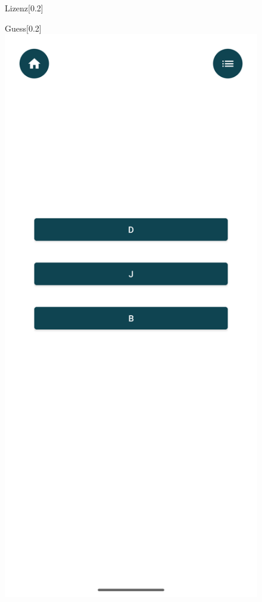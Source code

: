 \documentclass[12pt,a4paper]{article}
\begin{document}
\begin{figure}[h]
\begin{subcaptionbox}{Lizenz\label{fig:bild1}}[0.2\linewidth]
    \end{subcaptionbox}
    \hfill
    \begin{subcaptionbox}{Guess\label{fig:bild2}}[0.2\linewidth]
        {\includegraphics[width=\linewidth]{showcase/light_guess.png}}
    \end{subcaptionbox}
    \label{fig:nebeneinander}


\end{figure}
\end{document}
